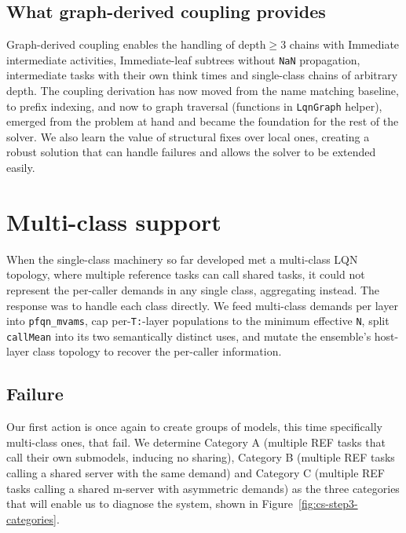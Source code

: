 \subsection{What graph-derived coupling provides}

Graph-derived coupling enables the handling of depth$\geq$3 chains with Immediate intermediate activities, Immediate-leaf subtrees without \texttt{NaN} propagation, intermediate tasks with their own think times and single-class chains of arbitrary depth. The coupling derivation has now moved from the name matching baseline, to prefix indexing, and now to graph traversal (functions in \texttt{LqnGraph} helper), emerged from the problem at hand and became the foundation for the rest of the solver. We also learn the value of structural fixes over local ones, creating a robust solution that can handle failures and allows the solver to be extended easily.

 



\section{Multi-class support}
\label{sec:contrib-step3}

When the single-class machinery so far developed met a multi-class LQN topology, where multiple reference tasks can call shared tasks, it could not represent the per-caller demands in any single class, aggregating instead. The response was to handle each class directly. We feed multi-class demands per layer into \texttt{pfqn\_mvams}, cap per-\texttt{T:}-layer populations to the minimum effective \texttt{N}, split \texttt{callMean} into its two semantically distinct uses, and mutate the ensemble's host-layer class topology to recover the per-caller information.

\subsection{Failure}

Our first action is once again to create groups of models, this time specifically multi-class ones, that fail. We determine Category A (multiple REF tasks that call their own submodels, inducing no sharing), Category B (multiple REF tasks calling a shared server with the same demand) and Category C (multiple REF tasks calling a shared m-server with asymmetric demands) as the three categories that will enable us to diagnose the system, shown in Figure~\ref{fig:cs-step3-categories}.

